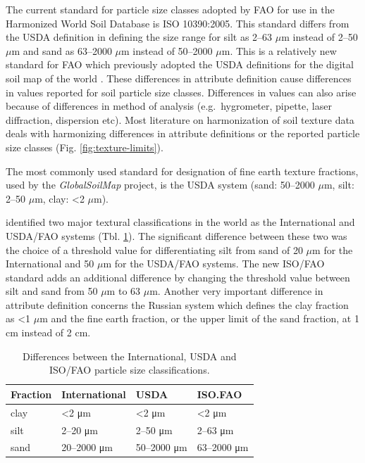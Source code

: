 \documentclass[graybox,natbib,nospthms,UStrade]{svmono}
\let\BeginKnitrBlock\begin \let\EndKnitrBlock\end
\let\BeginKnitrBlock\begin \let\EndKnitrBlock\end
\begin{document}
The current standard for particle size classes adopted by FAO for use in
the Harmonized World Soil Database is ISO 10390:2005. This standard
differs from the USDA definition in defining the size range for silt as
2--63 \(\mu\)m instead of 2--50 \(\mu\)m and sand as 63--2000 \(\mu\)m instead of
50--2000 \(\mu\)m. This is a relatively
new standard for FAO which previously adopted the USDA definitions for
the digital soil map of the world \citep{Nachtergaele2010press}. These
differences in attribute definition cause differences in values reported
for soil particle size classes. Differences in values can also arise
because of differences in method of analysis (e.g.~hygrometer, pipette,
laser diffraction, dispersion etc). Most literature on harmonization of soil
texture data deals with harmonizing differences in attribute definitions
or the reported particle size classes
(Fig. \ref{fig:texture-limits}).

\BeginKnitrBlock{rmdnote}
The most commonly used standard for designation of fine earth texture
fractions, used by the \emph{GlobalSoilMap} project, is the USDA
system (sand: 50--2000 \(\mu\)m, silt: 2--50 \(\mu\)m, clay: \textless{}2 \(\mu\)m).
\EndKnitrBlock{rmdnote}

\citet{Minasny2001AJSR} identified two major textural classifications in the
world as the International and USDA/FAO systems (Tbl. \ref{tab:usdafaotexture}).
The significant difference between these two was the choice of a
threshold value for differentiating silt from sand of 20 \(\mu\)m for the
International and 50 \(\mu\)m for the USDA/FAO systems. The new ISO/FAO standard
adds an additional difference by changing the threshold value between
silt and sand from 50 \(\mu\)m to 63 \(\mu\)m. Another very important difference in attribute
definition concerns the Russian system which defines the clay fraction
as \textless{}1 \(\mu\)m and the fine earth fraction, or the upper limit of the sand
fraction, at 1 cm instead of 2 cm.

\begin{table}[t]

\caption{\label{tab:usdafaotexture}Differences between the International, USDA and ISO/FAO particle size classifications.}
\centering
\begin{tabular}{llll}
\toprule
Fraction & International & USDA & ISO.FAO\\
\midrule
clay & <2 μm & <2 μm & <2 μm\\
silt & 2–20 μm & 2–50 μm & 2–63 μm\\
sand & 20–2000 μm & 50–2000 μm & 63–2000 μm\\
\bottomrule
\end{tabular}
\end{table}
\end{document}

